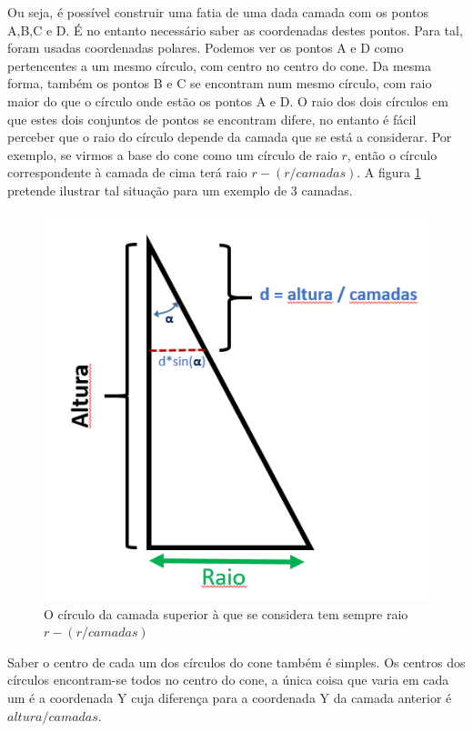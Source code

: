 Ou seja, é possível construir uma fatia de uma dada camada com os pontos A,B,C e D. É no entanto necessário saber as coordenadas destes pontos. Para tal, foram usadas coordenadas polares. Podemos ver os pontos A e D como pertencentes a um mesmo círculo, com centro no centro do cone. Da mesma forma, também os pontos B e C se encontram num mesmo círculo, com raio maior do que o círculo onde estão os pontos A e D. O raio dos dois círculos em que estes dois conjuntos de pontos se encontram difere, no entanto é fácil perceber que o raio do círculo depende da camada que se está a considerar. Por exemplo, se virmos a base do cone como um círculo de raio $r$, então o círculo correspondente à camada de cima terá raio $r - (r/camadas)$. A figura \ref{p1:fig:p3_conePerfil} pretende ilustrar tal situação para um exemplo de 3 camadas.

\begin{figure}[<+htpb+>]
	\centering
	\includegraphics[scale=0.5]{imagens/p3_conePerfil.png}
	\caption{O círculo da camada superior à que se considera tem sempre raio $r - (r/camadas)$}
	\label{p1:fig:p3_conePerfil}
\end{figure}

Saber o centro de cada um dos círculos do cone também é simples. Os centros dos círculos encontram-se todos no centro do cone, a única coisa que varia em cada um é a coordenada Y cuja diferença para a coordenada Y da camada anterior é $altura / camadas$.



